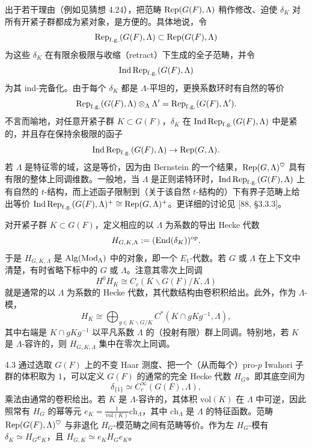 出于若干理由（例如见猜想 4.24），把范畴 $\operatorname{Rep}(G(F),\Lambda)$ 稍作修改、迫使 $\delta_K$ 对所有开紧子群都成为紧对象，是方便的。具体地说，令
\[
\operatorname{Rep}_{\mathrm{f.g.}}(G(F),\Lambda)\subset\operatorname{Rep}(G(F),\Lambda)
\]
为这些 $\delta_K$ 在有限余极限与收缩（retract）下生成的全子范畴，并令
\[
\operatorname{Ind}\operatorname{Rep}_{\mathrm{f.g.}}(G(F),\Lambda)
\]
为其 ind-完备化。由于每个 $\delta_K$ 都是 $\Lambda$-平坦的，更换系数环时有自然的等价
\[
\operatorname{Rep}_{\mathrm{f.g.}}(G(F),\Lambda)\otimes_\Lambda\Lambda'=\operatorname{Rep}_{\mathrm{f.g.}}(G(F),\Lambda').
\]
不言而喻地，对任意开紧子群 $K\subset G(F)$，$\delta_K$ 在 $\operatorname{Ind}\operatorname{Rep}_{\mathrm{f.g.}}(G(F),\Lambda)$ 中是紧的，并且存在保持余极限的函子
\[
\operatorname{Ind}\operatorname{Rep}_{\mathrm{f.g.}}(G(F),\Lambda)\to\operatorname{Rep}(G,\Lambda).
\]
若 $\Lambda$ 是特征零的域，这是等价，因为由 Bernstein 的一个结果，$\operatorname{Rep}(G,\Lambda)^{\heartsuit}$ 具有有限的整体上同调维数。一般地，当 $\Lambda$ 是正则诺特环时，$\operatorname{Ind}\operatorname{Rep}_{\mathrm{f.g.}}(G(F),\Lambda)$ 上有自然的 $t$-结构，而上述函子限制到（关于该自然 $t$-结构的）下有界子范畴上给出等价 $\operatorname{Ind}\operatorname{Rep}_{\mathrm{f.g.}}(G(F),\Lambda)^+\cong\operatorname{Rep}(G,\Lambda)^+$。更详细的讨论见 [88, §3.3.3]。

对开紧子群 $K\subset G(F)$，定义相应的以 $\Lambda$ 为系数的导出 Hecke 代数
\[
H_{G,K,\Lambda}:=(\operatorname{End}(\delta_K))^{\mathrm{op}}.
\]
于是 $H_{G,K,\Lambda}$ 是 $\mathrm{Alg}(\operatorname{Mod}_\Lambda)$ 中的对象，即一个 $E_1$-代数。若 $G$ 或 $\Lambda$ 在上下文中清楚，有时省略下标中的 $G$ 或 $\Lambda$。注意其零次上同调
\[
H^0H_K\cong C_c(K\backslash G(F)/K,\Lambda)
\]
就是通常的以 $\Lambda$ 为系数的 Hecke 代数，其代数结构由卷积积给出。此外，作为 $\Lambda$-模，
\[
H_K\cong\bigoplus_{g\in K\backslash G/K}C^*(K\cap gKg^{-1},\Lambda),
\]
其中右端是 $K\cap gKg^{-1}$ 以平凡系数 $\Lambda$ 的（投射有限）群上同调。特别地，若 $K$ 是 $\Lambda$-容许的，则 $H_{G,K,\Lambda}$ 集中在零次上同调。

\begin{rem}{4.3}
通过选取 $G(F)$ 上的不变 Haar 测度、把一个（从而每个）pro-$p$ Iwahori 子群的体积取为 $1$，可以定义 $G(F)$ 的通常的完全 Hecke 代数 $H_G$。即其底空间为
\[
\delta_{\{1\}}\simeq C_c^\infty(G(F),\Lambda),
\]
乘法由通常的卷积给出。若 $K$ 是 $\Lambda$-容许的，其体积 $\mathrm{vol}(K)$ 在 $\Lambda$ 中可逆，因此照常有 $H_G$ 的幂等元 $e_K=\frac{1}{\mathrm{vol}(K)}\mathrm{ch}_\Lambda$，其中 $\mathrm{ch}_\Lambda$ 是 $\Lambda$ 的特征函数。范畴 $\operatorname{Rep}(G(F),\Lambda)^{\heartsuit}$ 与非退化 $H_G$-模范畴之间有范畴等价。作为左 $H_G$-模有 $\delta_K\simeq H_Ge_K$，且 $H_{G,K}\simeq e_KH_Ge_K$。
\end{rem}

